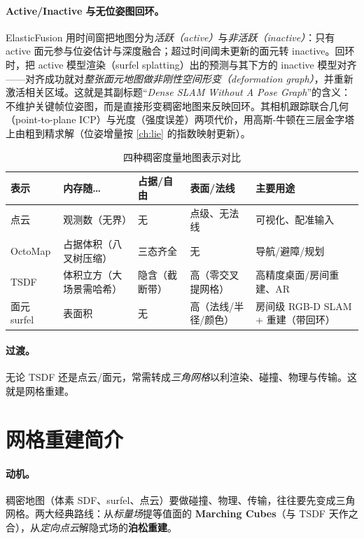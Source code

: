 \paragraph{Active/Inactive 与无位姿图回环。}
ElasticFusion 用时间窗把地图分为\emph{活跃（active）}与\emph{非活跃（inactive）}：只有 active 面元参与位姿估计与深度融合；超过时间阈未更新的面元转 inactive。回环时，把 active 模型渲染（surfel splatting）出的预测与其下方的 inactive 模型对齐——对齐成功就对\emph{整张面元地图做非刚性空间形变（deformation graph）}，并重新激活相关区域。这就是其副标题“\emph{Dense SLAM Without A Pose Graph}”的含义：不维护关键帧位姿图，而是直接形变稠密地图来反映回环。其相机跟踪联合几何（point-to-plane ICP）与光度（强度误差）两项代价，用高斯-牛顿在三层金字塔上由粗到精求解（位姿增量按 \cref{ch:lie} 的指数映射更新）。

\begin{table}[H]\centering\small
\caption{四种稠密度量地图表示对比}
\label{tab:dense-repr-compare}
\begin{tabular}{p{} p{} p{} p{} p{}}
\toprule
表示 & 内存随… & 占据/自由 & 表面/法线 & 主要用途 \\
\midrule
点云 & 观测数（无界） & 无 & 点级、无法线 & 可视化、配准输入 \\
OctoMap & 占据体积（八叉树压缩） & 三态齐全 & 无 & 导航/避障/规划 \\
TSDF & 体积立方（大场景需哈希） & 隐含（截断带） & 高（零交叉提网格） & 高精度桌面/房间重建、AR \\
面元 surfel & 表面积 & 无 & 高（法线/半径/颜色） & 房间级 RGB-D SLAM $+$ 重建（带回环） \\
\bottomrule
\end{tabular}
\end{table}

\paragraph{过渡。}
无论 TSDF 还是点云/面元，常需转成\emph{三角网格}以利渲染、碰撞、物理与传输。这就是网格重建。

\section{网格重建简介}
\label{sec:dense-mesh}

\paragraph{动机。}
稠密地图（体素 SDF、surfel、点云）要做碰撞、物理、传输，往往要先变成三角网格。两大经典路线：从\emph{标量场}提等值面的 \textbf{Marching Cubes}（与 TSDF 天作之合），从\emph{定向点云}解隐式场的\textbf{泊松重建}。

